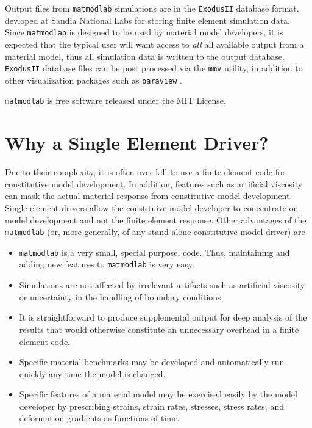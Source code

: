 \documentclass[pdf,ps2pdf,12pt,report,strict]{SANDreport/SANDreport}
\newcommand{\mml}{\texttt{matmodlab}}
\newcommand{\mmv}{\texttt{mmv}}
\newcommand{\exodusii}{{\sc\texttt{ExodusII}}}
\newcommand{\paraview}[1]{{\sc\texttt{paraview}}}
\begin{document}
Output files from \mml{} simulations are in the \exodusii{} \cite{exodus}
database format, devloped at Sandia National Labs for storing finite element
simulation data. Since \mml{} is designed to be used by material model
developers, it is expected that the typical user will want access to
\emph{all} all available output from a material model, thus all simulation
data is written to the output database. \exodusii{} database files can be post
processed via the \mmv{} utility, in addition to other visualization
packages such as \paraview{} \cite{paraview}.

\mml{} is free software released under the MIT License.

\section{Why a Single Element Driver?}
Due to their complexity, it is often over kill to use a finite element code
for constitutive model development. In addition, features such as artificial
viscosity can mask the actual material response from constitutive model
development. Single element drivers allow the constituive model developer to
concentrate on model development and not the finite element response. Other
advantages of the \mml{} (or, more generally, of any stand-alone
constitutive model driver) are

\begin{itemize}
  \item \mml{} is a very small, special purpose, code. Thus, maintaining and
  adding new features to \mml{} is very easy.

  \item Simulations are not affected by irrelevant artifacts such as
  artificial viscosity or uncertainty in the handling of boundary conditions.

  \item It is straightforward to produce supplemental output for deep analysis
  of the results that would otherwise constitute an unnecessary overhead in a
  finite element code.

  \item Specific material benchmarks may be developed and automatically run
  quickly any time the model is changed.

  \item Specific features of a material model may be exercised easily by the
  model developer by prescribing strains, strain rates, stresses, stress
  rates, and deformation gradients as functions of time.
\end{itemize}
\end{document}
